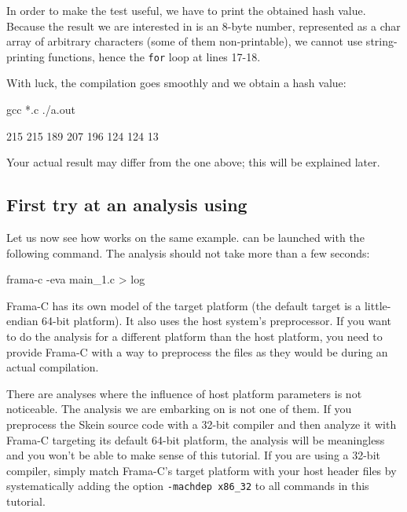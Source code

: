 \documentclass{frama-c-book}
\begin{document}
In order to make the test useful, we have to print
the obtained hash value. Because the result we are interested in is
an 8-byte number, represented as a char array of
arbitrary characters (some of them non-printable), we cannot
use string-printing functions, hence the \lstinline|for| loop at lines 17-18.
\goodbreak

With luck, the compilation goes smoothly and we obtain
a hash value:
\begin{frama-c-commands}
gcc *.c
./a.out
\end{frama-c-commands}

\begin{logsmath}
215
215
189
207
196
124
124
13
\end{logsmath}

\begin{important}
  Your actual result may differ from the one above;
  this will be explained later.
\end{important}

\subsection{First try at an analysis using \Eva{}}

Let us now see how \Eva{} works on the same example.
\Eva{} can be launched with the following command.
The analysis should not take more than a few seconds:
\begin{frama-c-commands}
frama-c -eva main_1.c > log
\end{frama-c-commands}

Frama-C has its own model of the target platform (the default target is
a little-endian 64-bit platform). It also uses the host system's preprocessor.
If you want to do the analysis for a different platform than the host platform,
you need to provide Frama-C with a way to preprocess the files as they
would be during an actual compilation.

There are analyses where the influence of host platform parameters
is not noticeable. The analysis we are embarking on is not one of them.
If you preprocess the Skein source code with a 32-bit compiler and
then analyze it with Frama-C targeting its default 64-bit platform,
the analysis will be meaningless and you won't be able to make sense of
this tutorial.
If you are using a 32-bit compiler, simply match
Frama-C's target platform with your host header files by systematically adding
the option \verb|-machdep x86_32| to all commands in
this tutorial.
\end{document}
